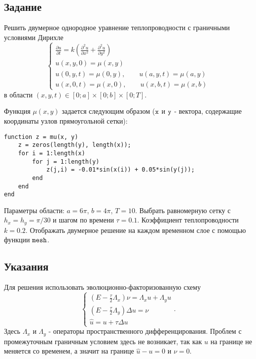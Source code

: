 \chapter{}

\section{Задание}
Решить двумерное однородное уравнение теплопроводности с граничными условиями Дирихле 
\begin{equation} \label{c10eq1}
	\begin{cases}
		\displaystyle \frac{\partial u}{\partial t} = k \left( \frac{\partial^2 u}{\partial x^2} + \frac{\partial^2 u}{\partial y^2} \right) \\
		\displaystyle u(x,y,0) = \mu(x,y) \\
		u(0,y,t) = \mu(0,y), \qquad u(a,y,t) = \mu(a,y)\\  
		u(x,0,t) = \mu(x,0), \qquad u(x,b,t) = \mu(x,b)
	\end{cases}
\end{equation}
в области $(x,y,t) \in [0; a] \times [0; b] \times [0; T]$.

Функция $\mu(x,y)$ задается следующим образом ($\texttt{\lstinline|x|}$ и $\texttt{\lstinline|y|}$ - вектора, содержащие координаты узлов прямоугольной сетки):
\begin{matlablisting}
	\begin{verbatim}
function z = mu(x, y)
    z = zeros(length(y), length(x));
    for i = 1:length(x)
        for j = 1:length(y)
            z(j,i) = -0.01*sin(x(i)) + 0.05*sin(y(j));
        end
    end
end
	\end{verbatim}
\end{matlablisting}
Параметры области: $a = 6\pi$, $b = 4\pi$, $T = 10$. Выбрать равномерную сетку с $h_x = h_y = \pi/30$ и шагом по времени $\tau = 0.1$. Коэффициент теплопроводности $k = 0.2$. Отображать двумерное решение на каждом временном слое с помощью функции $\texttt{\lstinline|mesh|}$.

\section{Указания}
Для решения использовать эволюционно-факторизованную схему
\begin{equation} \label{c10eq2}
	\begin{cases}
		\displaystyle \left( E - \frac{\tau}{2} \Lambda_x \right) \nu = \Lambda_x u + \Lambda_y u \\
		\displaystyle \left( E - \frac{\tau}{2} \Lambda_y \right) \Delta u = \nu \\
		\hat{u} = u + \tau \Delta u
	\end{cases}.
\end{equation}
Здесь $\Lambda_x$ и $\Lambda_y$ - операторы пространственного дифференцирования. Проблем с промежуточным граничным условием здесь не возникает, так как $u$ на границе не меняется со временем, а значит на границе $\hat{u} - u = 0$ и $\nu = 0$.

